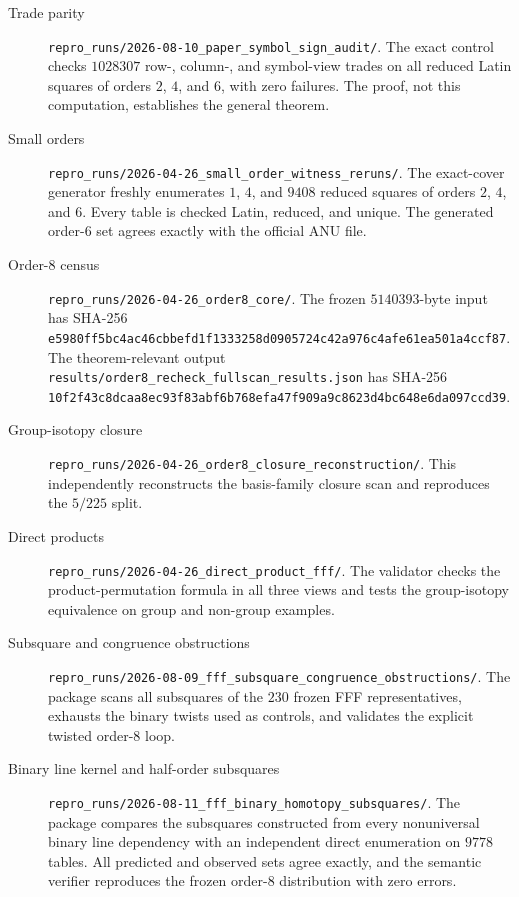\begin{description}
\item[Trade parity]
\nolinkurl{repro_runs/2026-08-10_paper_symbol_sign_audit/}.
The exact control checks $1028307$ row-, column-, and symbol-view trades on all
reduced Latin squares of orders $2$, $4$, and $6$, with zero failures.  The
proof, not this computation, establishes the general theorem.

\item[Small orders]
\nolinkurl{repro_runs/2026-04-26_small_order_witness_reruns/}.
The exact-cover generator freshly enumerates $1$, $4$, and $9408$ reduced
squares of orders $2$, $4$, and $6$.  Every table is checked Latin, reduced,
and unique.  The generated order-$6$ set agrees exactly with the official ANU
file.

\item[Order-$8$ census]
\nolinkurl{repro_runs/2026-04-26_order8_core/}.
The frozen $5140393$-byte input has SHA-256
\nolinkurl{e5980ff5bc4ac46cbbefd1f1333258d0905724c42a976c4afe61ea501a4ccf87}.
The theorem-relevant output
\nolinkurl{results/order8_recheck_fullscan_results.json} has SHA-256
\nolinkurl{10f2f43c8dcaa8ec93f83abf6b768efa47f909a9c8623d4bc648e6da097ccd39}.

\item[Group-isotopy closure]
\nolinkurl{repro_runs/2026-04-26_order8_closure_reconstruction/}.
This independently reconstructs the basis-family closure scan and reproduces
the $5/225$ split.

\item[Direct products]
\nolinkurl{repro_runs/2026-04-26_direct_product_fff/}.
The validator checks the product-permutation formula in all three views and
tests the group-isotopy equivalence on group and non-group examples.

\item[Subsquare and congruence obstructions]
\nolinkurl{repro_runs/2026-08-09_fff_subsquare_congruence_obstructions/}.
The package scans all subsquares of the $230$ frozen FFF representatives,
exhausts the binary twists used as controls, and validates the explicit
twisted order-$8$ loop.

\item[Binary line kernel and half-order subsquares]
\nolinkurl{repro_runs/2026-08-11_fff_binary_homotopy_subsquares/}.
The package compares the subsquares constructed from every nonuniversal
binary line dependency with an independent direct enumeration on $9778$
tables.  All predicted and observed sets agree exactly, and the semantic
verifier reproduces the frozen order-$8$ distribution with zero errors.


\end{description}
